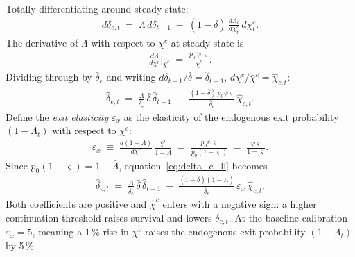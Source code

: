 \documentclass[authoryear, review, 12pt]{elsarticle}
\begin{document}
Totally differentiating around steady state:
\begin{align}
    d\delta_{e,t}
    \;=\; \bar\Lambda\,d\delta_{t-1}
    \;-\; (1-\bar\delta)\,\frac{d\Lambda_t}{d\chi_t^c}\,d\chi_t^c.
\end{align}
The derivative of $\Lambda$ with respect to $\chi^c$ at steady state is
\begin{align}
    \frac{d\Lambda}{d\chi^c}\bigg|_{\bar\chi^c}
    \;=\; \frac{p_0\,\psi\,\varsigma}{\bar\chi^c}.
\end{align}
Dividing through by $\bar\delta_e$ and writing $d\delta_{t-1}/\bar\delta = \hat\delta_{t-1}$,
$d\chi^c/\bar\chi^c = \hat\chi_{c,t}$:
\begin{align}\label{eq:delta_e_ll}
    \hat{\delta}_{e,t}
    \;=\; \frac{\bar\Lambda}{\bar\delta_e}\,\bar\delta\,\hat\delta_{t-1}
    \;-\; \frac{(1-\bar\delta)\,p_0\psi\varsigma}{\bar\delta_e}\,\hat\chi_{c,t}.
\end{align}
Define the \emph{exit elasticity} $\varepsilon_x$ as the elasticity of the endogenous exit
probability $(1-\Lambda_t)$ with respect to $\chi^c$:
\begin{align}\label{eq:dest_elast_def}
    \varepsilon_x \;\equiv\;
    \frac{d(1-\Lambda)}{d\chi^c}\,\frac{\bar\chi^c}{1-\bar\Lambda}
    \;=\; \frac{p_0\psi\varsigma}{p_0(1-\varsigma)}
    \;=\; \frac{\psi\varsigma}{1-\varsigma}.
\end{align}
Since $p_0(1-\varsigma) = 1-\bar\Lambda$, equation~\eqref{eq:delta_e_ll} becomes
\begin{align}\label{eq:delta_e_ll_compact}
    \hat{\delta}_{e,t}
    \;=\; \frac{\bar\Lambda}{\bar\delta_e}\,\bar\delta\,\hat\delta_{t-1}
    \;-\; \frac{(1-\bar\delta)(1-\bar\Lambda)}{\bar\delta_e}\,\varepsilon_x\,\hat\chi_{c,t}.
\end{align}
Both coefficients are positive and $\hat\chi^c$ enters with a negative sign:
a higher continuation threshold raises survival and lowers $\delta_{e,t}$.
At the baseline calibration $\varepsilon_x=5$, meaning a 1\,\% rise in $\chi^c$
raises the endogenous exit probability $(1-\Lambda_t)$ by 5\,\%.
\end{document}
